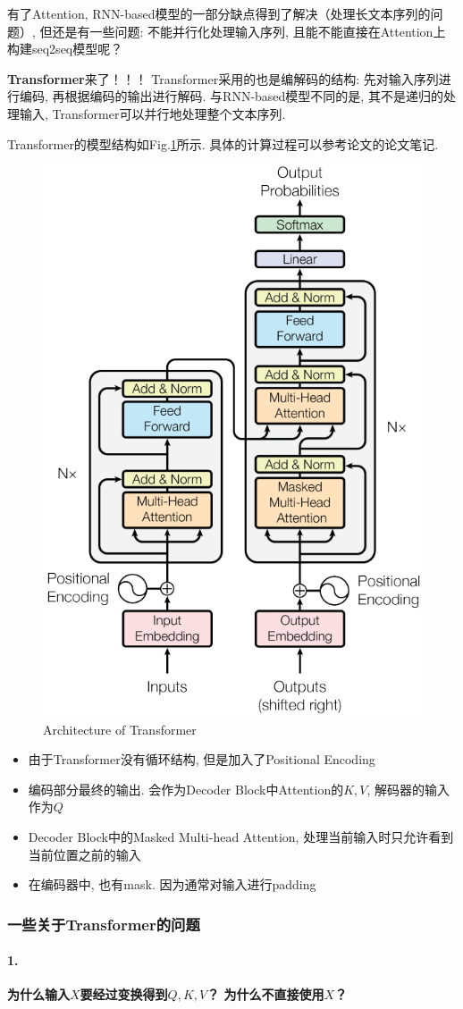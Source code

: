 有了Attention, RNN-based模型的一部分缺点得到了解决（处理长文本序列的问题）, 但还是有一些问题: 不能并行化处理输入序列, 且能不能直接在Attention上构建seq2seq模型呢？

\textbf{Transformer}\cite{vaswani2017attention}来了！！！
Transformer采用的也是编解码的结构: 先对输入序列进行编码, 再根据编码的输出进行解码. 与RNN-based模型不同的是, 其不是递归的处理输入, Transformer可以并行地处理整个文本序列.  

Transformer的模型结构如Fig.\ref{fig:transformer}所示. 具体的计算过程可以参考论文\cite{bivaswani2017attentionbid}的论文笔记. 
\begin{figure}[h] 
	\centering
	\includegraphics[width=.4\textwidth]{pics/Transformer.png}
	\caption{Architecture of Transformer}
	\label{fig:transformer}
\end{figure}

\begin{itemize}
	\item 由于Transformer没有循环结构, 但是加入了Positional Encoding
	\item 编码部分最终的输出. 会作为Decoder Block中Attention的$K, V$, 解码器的输入作为$Q$
	\item Decoder Block中的Masked Multi-head Attention, 处理当前输入时只允许看到当前位置之前的输入
	\item 在编码器中, 也有mask. 因为通常对输入进行padding
\end{itemize}

\subsubsection{一些关于Transformer的问题}
\paragraph{1.}{\textbf{为什么输入$X$要经过变换得到$Q, K, V$？ 为什么不直接使用$X$？}}

